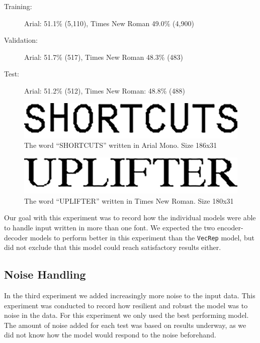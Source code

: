 \vspace{0.5cm}
\begin{minipage}{0.8\linewidth}
    \begin{description}
        \item[Training:]{Arial: 51.1\% (5,110), Times New Roman 49.0\% (4,900)}
        \item[Validation:]{Arial: 51.7\% (517), Times New Roman 48.3\% (483)}
        \item[Test:]{Arial: 51.2\% (512), Times New Roman: 48.8\% (488)}
    \end{description}
\end{minipage}

\begin{figure}[ht]
    \centering
    \includegraphics[width=.8\textwidth]{fig/experiments/SHORTCUTS_dpi.png}
    \captionsetup{justification=centering}
    \caption{The word ``SHORTCUTS'' written in Arial Mono. Size 186x31}
\end{figure}

\begin{figure}[ht]
    \centering
    \includegraphics[width=.8\textwidth]{fig/experiments/UPLIFTER_dpi.png}
    \captionsetup{justification=centering}
    \caption{The word ``UPLIFTER'' written in Times New Roman. Size 180x31}
\end{figure}

Our goal with this experiment was to record how the individual models were able to handle input written in more than one font. We expected the two encoder-decoder models to perform better in this experiment than the {\tt VecRep} model, but did not exclude that this model could reach satisfactory results either.

\subsection{Noise Handling}
In the third experiment we added increasingly more noise to the input data. This experiment was conducted to record how resilient and robust the model was to noise in the data. For this experiment we only used the best performing model. The amount of noise added for each test was based on results underway, as we did not know how the model would respond to the noise beforehand.

